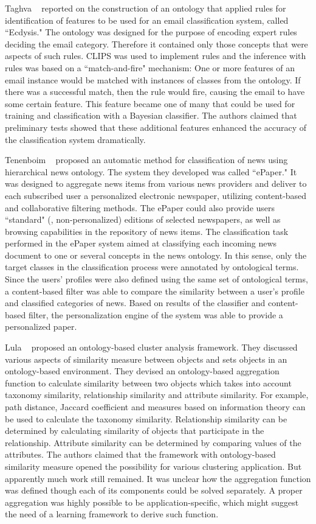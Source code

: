 Taghva \etal~\cite{Taghva2003Ont} reported on the construction of an ontology that applied rules for identification of features to be used for an email classification system, called ``Ecdysis." The ontology was designed for the purpose of encoding expert rules deciding the email category. Therefore it contained only those concepts that were aspects of such rules. CLIPS was used to implement rules and the inference with rules was based on a ``match-and-fire" mechanism: One or more features of an email instance would be matched with instances of classes from the ontology. If there was a successful match, then the rule would fire, causing the email to have some certain feature. This feature became one of many that could be used for training and classification with a Bayesian classifier. The authors claimed that preliminary tests showed that these additional features enhanced the accuracy of the classification system dramatically.

Tenenboim \etal~\cite{Tenenboim2008} proposed an automatic method for classification of news using hierarchical news ontology. The system they developed was called ``ePaper." It was designed to aggregate news items from various news providers and deliver to each subscribed user a personalized electronic newspaper, utilizing content-based and collaborative filtering methods. The ePaper could also provide users ``standard" (\ie, non-personalized) editions of selected newspapers, as well as browsing capabilities in the repository of news items. The classification task performed in the ePaper system aimed at classifying each incoming news document to one or several concepts in the news ontology. In this sense, only the target classes in the classification process were annotated by ontological terms. Since the users' profiles were also defined using the same set of ontological terms, a content-based filter was able to compare the similarity between a user's profile and classified categories of news. Based on results of the classifier and content-based filter, the personalization engine of the system was able to provide a personalized paper.

Lula \etal~\cite{Lula2008} proposed an ontology-based cluster analysis framework. They discussed various aspects of similarity measure between objects and sets objects in an ontology-based environment.  They devised an ontology-based aggregation function to calculate similarity between two objects which takes into account taxonomy similarity, relationship similarity and attribute similarity. For example, path distance, Jaccard coefficient and measures based on information theory can be used to calculate the taxonomy similarity. Relationship similarity can be determined by calculating similarity of objects that participate in the relationship. Attribute similarity can be determined by comparing values of the attributes. The authors claimed that the framework with ontology-based similarity measure opened the possibility for various clustering application. But apparently much work still remained. It was unclear how the aggregation function was defined though each of its components could be solved separately. A proper aggregation was highly possible to be application-specific, which might suggest the need of a learning framework to derive such function.

